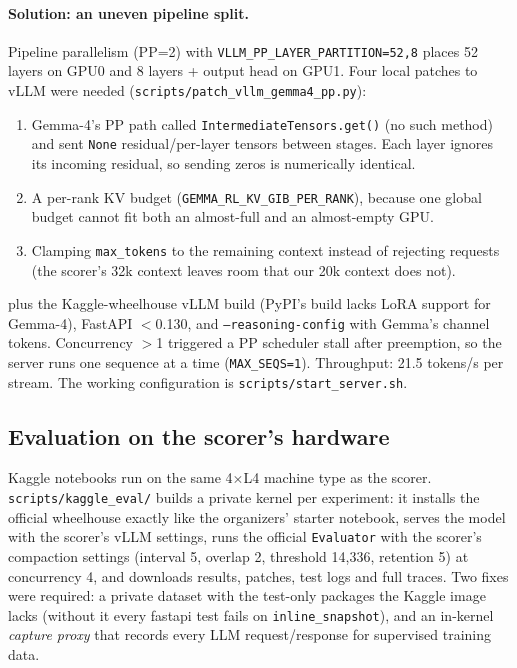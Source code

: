 \documentclass[10pt,a4paper]{article}
\newcommand{\code}[1]{\texttt{#1}}
\newcommand{\1}{\mathbb{1}}
\begin{document}
\paragraph{Solution: an uneven pipeline split.} Pipeline parallelism (PP=2) with \code{VLLM\_PP\_LAYER\_PARTITION=52,8}
places 52 layers on GPU0 and 8 layers + output head on GPU1. Four local patches to vLLM were needed
(\code{scripts/patch\_vllm\_gemma4\_pp.py}):
\begin{enumerate}
\item Gemma-4's PP path called \code{IntermediateTensors.get()} (no such method) and sent \code{None}
  residual/per-layer tensors between stages. Each layer ignores its incoming residual, so sending zeros is
  numerically identical.
\item A per-rank KV budget (\code{GEMMA\_RL\_KV\_GIB\_PER\_RANK}), because one global budget cannot fit both
  an almost-full and an almost-empty GPU.
\item Clamping \code{max\_tokens} to the remaining context instead of rejecting requests (the scorer's 32k
  context leaves room that our 20k context does not).
\end{enumerate}
plus the Kaggle-wheelhouse vLLM build (PyPI's build lacks LoRA support for Gemma-4), FastAPI $<$0.130,
and \code{--reasoning-config} with Gemma's channel tokens. Concurrency $>$1 triggered a PP scheduler stall
after preemption, so the server runs one sequence at a time (\code{MAX\_SEQS=1}). Throughput: 21.5
tokens/s per stream. The working configuration is \code{scripts/start\_server.sh}.

\subsection{Evaluation on the scorer's hardware}
Kaggle notebooks run on the same 4$\times$L4 machine type as the scorer. \code{scripts/kaggle\_eval/} builds a
private kernel per experiment: it installs the official wheelhouse exactly like the organizers' starter
notebook, serves the model with the scorer's vLLM settings, runs the official \code{Evaluator} with the
scorer's compaction settings (interval 5, overlap 2, threshold 14{,}336, retention 5) at concurrency 4, and
downloads results, patches, test logs and full traces. Two fixes were required: a private dataset with the
test-only packages the Kaggle image lacks (without it every fastapi test fails on \code{inline\_snapshot}),
and an in-kernel \emph{capture proxy} that records every LLM request/response for supervised training data.
\end{document}
